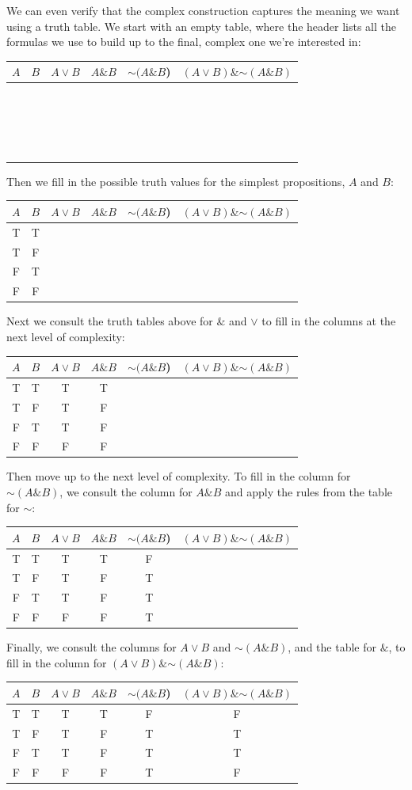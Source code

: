 \documentclass[justified]{tufte-book}
\renewcommand{\neg}{\mathbin{\sim}}
\renewcommand{\wedge}{\mathbin{\&}}
\theoremstyle{definition}
\theoremstyle{definition}
\theoremstyle{definition}
\theoremstyle{remark}
\begin{document}
We can even verify that the complex construction captures the meaning we want using a truth table. We start with an empty table, where the header lists all the formulas we use to build up to the final, complex one we're interested in:
\begin{longtable}[]{@{}cccccc@{}}
\toprule
\(A\) & \(B\) & \(A \vee B\) & \(A \& B\) & \(\neg(A \wedge B\)) & \((A \vee B) \wedge \neg (A \wedge B)\)\tabularnewline
\midrule
\endhead
\(\;\) & & & & &\tabularnewline
\(\;\) & & & & &\tabularnewline
\(\;\) & & & & &\tabularnewline
\(\;\) & & & & &\tabularnewline
\bottomrule
\end{longtable}
\noindent Then we fill in the possible truth values for the simplest propositions, \(A\) and \(B\):
\begin{longtable}[]{@{}cccccc@{}}
\toprule
\(A\) & \(B\) & \(A \vee B\) & \(A \& B\) & \(\neg(A \wedge B\)) & \((A \vee B) \wedge \neg (A \wedge B)\)\tabularnewline
\midrule
\endhead
T & T & & & &\tabularnewline
T & F & & & &\tabularnewline
F & T & & & &\tabularnewline
F & F & & & &\tabularnewline
\bottomrule
\end{longtable}
\noindent Next we consult the truth tables above for \(\&\) and \(\vee\) to fill in the columns at the next level of complexity:
\begin{longtable}[]{@{}cccccc@{}}
\toprule
\(A\) & \(B\) & \(A \vee B\) & \(A \& B\) & \(\neg(A \wedge B\)) & \((A \vee B) \wedge \neg (A \wedge B)\)\tabularnewline
\midrule
\endhead
T & T & T & T & &\tabularnewline
T & F & T & F & &\tabularnewline
F & T & T & F & &\tabularnewline
F & F & F & F & &\tabularnewline
\bottomrule
\end{longtable}
\noindent Then move up to the next level of complexity. To fill in the column for \(\neg(A \wedge B)\), we consult the column for \(A \wedge B\) and apply the rules from the table for \(\neg\):
\begin{longtable}[]{@{}cccccc@{}}
\toprule
\(A\) & \(B\) & \(A \vee B\) & \(A \& B\) & \(\neg(A \wedge B\)) & \((A \vee B) \wedge \neg (A \wedge B)\)\tabularnewline
\midrule
\endhead
T & T & T & T & F &\tabularnewline
T & F & T & F & T &\tabularnewline
F & T & T & F & T &\tabularnewline
F & F & F & F & T &\tabularnewline
\bottomrule
\end{longtable}
\noindent Finally, we consult the columns for \(A \vee B\) and \(\neg(A \wedge B)\), and the table for \(\&\), to fill in the column for \((A \vee B) \wedge \neg(A \& B)\):
\begin{longtable}[]{@{}cccccc@{}}
\toprule
\(A\) & \(B\) & \(A \vee B\) & \(A \& B\) & \(\neg(A \wedge B\)) & \((A \vee B) \wedge \neg (A \wedge B)\)\tabularnewline
\midrule
\endhead
T & T & T & T & F & F\tabularnewline
T & F & T & F & T & T\tabularnewline
F & T & T & F & T & T\tabularnewline
F & F & F & F & T & F\tabularnewline
\bottomrule
\end{longtable}
\end{document}
